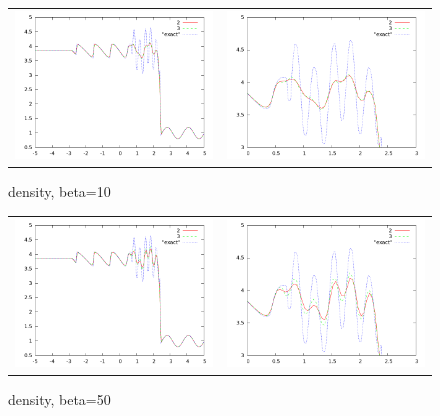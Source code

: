 \documentclass[10pt]{article}
\begin{document}
\begin{figure}
  \begin{center}
	\begin{tabular}{cc}
      \includegraphics[width=.425\textwidth]{10.png} &
	  \includegraphics[width=.425\textwidth]{10zoom.png}
	\end{tabular}
  \end{center}
  \caption{density, beta=10}
  \label{fig:pvcellcomp}
\end{figure}

\begin{figure}
  \begin{center}
	\begin{tabular}{cc}
      \includegraphics[width=.425\textwidth]{50.png} &
	  \includegraphics[width=.425\textwidth]{50zoom.png}
	\end{tabular}
  \end{center}
  \caption{density, beta=50}
  \label{fig:pvcellcomp}
\end{figure}
\end{document}
